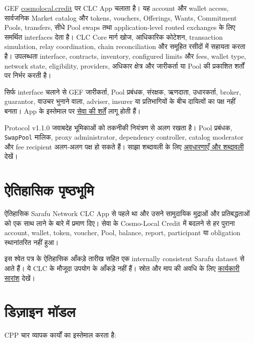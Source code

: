 \documentclass[11pt]{article}
\begin{document}
GEF \href{https://cosmolocal.credit}{cosmolocal.credit} पर CLC App चलाता है। यह account और wallet access, सार्वजनिक Market catalog और tokens, vouchers, Offerings, Wants, Commitment Pools, transfers, सीधे Pool swaps तथा application-level routed exchanges के लिए समर्थित interfaces देता है। CLC Core मार्ग खोज, आधिकारिक कोटेशन, transaction simulation, relay coordination, chain reconciliation और समूहित रसीदों में सहायता करता है। उपलब्धता interface, contracts, inventory, configured limits और fees, wallet type, network state, eligibility, providers, अधिकार क्षेत्र और जारीकर्ता या Pool की प्रकाशित शर्तों पर निर्भर करती है।

सिर्फ interface चलाने से GEF जारीकर्ता, Pool प्रबंधक, संरक्षक, ऋणदाता, उधारकर्ता, broker, guarantor, वाउचर भुनाने वाला, adviser, insurer या प्रतिभागियों के बीच दायित्वों का पक्ष नहीं बनता। App के इस्तेमाल पर \href{https://docs.cosmolocal.credit/hi/governance/terms}{सेवा की शर्तें} लागू होती हैं।

Protocol v1.1.0 जवाबदेह भूमिकाओं को तकनीकी नियंत्रण से अलग रखता है। Pool प्रबंधक, \texttt{SwapPool} मालिक, proxy administrator, dependency controller, catalog moderator और fee recipient अलग-अलग पक्ष हो सकते हैं। साझा शब्दावली के लिए \href{https://docs.cosmolocal.credit/hi/introduction/concepts}{अवधारणाएँ और शब्दावली} देखें।

\section*{ऐतिहासिक पृष्ठभूमि}

ऐतिहासिक Sarafu Network CLC App से पहले था और उसने सामुदायिक मुद्राओं और प्रतिबद्धताओं को एक साथ लाने के बारे में प्रमाण दिए। सेवा के Cosmo-Local Credit में बदलने से हर पुराना account, wallet, token, voucher, Pool, balance, report, participant या obligation स्थानांतरित नहीं हुआ।

इस श्वेत पत्र के ऐतिहासिक आँकड़े तारीख सहित एक internally consistent Sarafu dataset से आते हैं। ये CLC के मौजूदा उपयोग के आँकड़े नहीं हैं। स्रोत और माप की अवधि के लिए \href{https://docs.cosmolocal.credit/hi/white-paper/executive-summary}{कार्यकारी सारांश} देखें।

\section*{डिज़ाइन मॉडल}

CPP चार व्यापक कार्यों का इस्तेमाल करता है:
\end{document}
